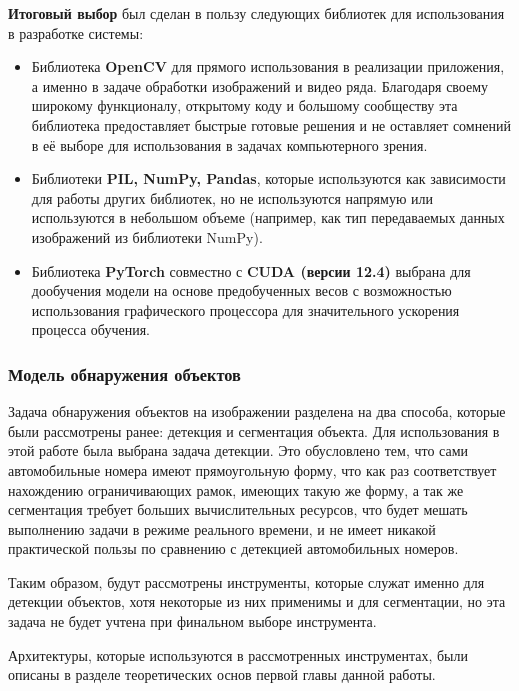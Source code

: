 \documentclass[a4paper,12pt]{article}
\begin{document}
\textbf{Итоговый выбор} был сделан в пользу следующих библиотек для использования в разработке системы:
\begin{itemize}
    \item Библиотека \textbf{OpenCV} для прямого использования в реализации приложения, а именно в задаче обработки изображений и видео ряда. Благодаря своему широкому функционалу, открытому коду и большому сообществу эта библиотека предоставляет быстрые готовые решения и не оставляет сомнений в её выборе для использования в задачах компьютерного зрения.
    \item Библиотеки \textbf{PIL, NumPy, Pandas}, которые используются как зависимости для работы других библиотек, но не используются напрямую или используются в небольшом объеме (например, как тип передаваемых данных изображений из библиотеки NumPy).
    \item Библиотека \textbf{PyTorch} совместно с  \textbf{CUDA (версии 12.4)} выбрана для дообучения модели на основе предобученных весов с возможностью использования графического процессора для значительного ускорения процесса обучения.
\end{itemize}

\subsubsection{Модель обнаружения объектов}

Задача обнаружения объектов на изображении разделена на два способа, которые были рассмотрены ранее: детекция и сегментация объекта. Для использования в этой работе была выбрана задача детекции. Это обусловлено тем, что сами автомобильные номера имеют прямоугольную форму, что как раз соответствует нахождению ограничивающих рамок, имеющих такую же форму, а так же сегментация требует больших вычислительных ресурсов, что будет мешать выполнению задачи в режиме реального времени, и не имеет никакой практической пользы по сравнению с детекцией автомобильных номеров.

Таким образом, будут рассмотрены инструменты, которые служат именно для детекции объектов, хотя некоторые из них применимы и для сегментации, но эта задача не будет учтена при финальном выборе инструмента.

Архитектуры, которые используются в рассмотренных инструментах, были описаны в разделе теоретических основ первой главы данной работы. 
\end{document}
